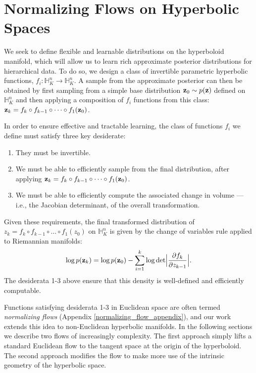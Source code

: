 \section{Normalizing Flows on Hyperbolic Spaces}
We seek to define flexible and learnable distributions on the hyperboloid manifold, which will allow us to learn rich approximate posterior distributions for hierarchical data.
To do so, we design a class of invertible parametric hyperbolic functions, $f_i: \mathbb{H}^n_K \to \mathbb{H}^n_K$.
A sample from the approximate posterior can then be obtained by first sampling from a simple base distribution $\mathbf{z}_0 \sim p(\mathbf{z})$ defined on $\mathbb{H}^n_K$ and then applying a composition of $f_i$ functions from this class: $\mathbf{z}_k = f_k \circ f_{k-1} \circ \dots \circ f_1(\mathbf{z}_0)$.

In order to ensure effective and tractable learning, the class of functions $f_i$ we define must satisfy three key desiderate:
\begin{enumerate}[itemsep=0pt, parsep=0pt, topsep=0pt]
    \item They must be invertible. 
    \item We must be able to efficiently sample from the final distribution, after applying $\mathbf{z}_k = f_k \circ f_{k-1} \circ \dots \circ f_1(\mathbf{z}_0)$. 
    \item We must be able to efficiently compute the associated change in volume ---i.e., the Jacobian determinant, of the overall transformation.
\end{enumerate}
 Given these requirements, the final transformed distribution of  $z_k = f_k \circ f_{k-1} \circ \dots \circ f_1(z_0)$ on $\mathbb{H}^n_K$ is given by the change of variables rule applied to Riemannian manifolds:
\begin{equation}
    \log p(\mathbf{z}_k) = \log p(\mathbf{z}_0) - \sum_{i=1}^k\log \textnormal{det}\Big|\frac{\partial f_k}{\partial z_{k-1}} \Big|.
\end{equation}
The desiderata 1-3 above ensure that this density is well-defined and efficiently computable. 

Functions satisfying desiderata 1-3 in Euclidean space are often termed {\em normalizing flows} (Appendix \ref{normalizing_flow_appendix}), and our work extends this idea to non-Euclidean hyperbolic manifolds. In the following sections we describe two flows of increasingly complexity. The first approach simply lifts a standard Euclidean flow to the tangent space at the origin of the hyperboloid.
The second approach modifies the flow to make more use of the intrinsic geometry of the hyperbolic space.

